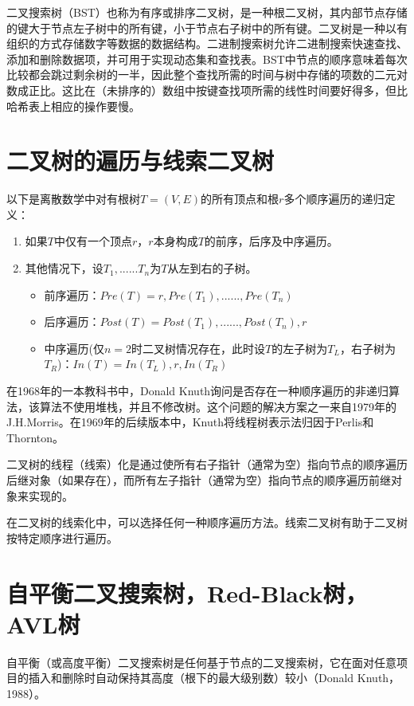 二叉搜索树（BST）\cite{enwiki:1027048298}也称为有序或排序二叉树，是一种根二叉树，其内部节点存储的键大于节点左子树中的所有键，小于节点右子树中的所有键。二叉树是一种以有组织的方式存储数字等数据的数据结构。二进制搜索树允许二进制搜索快速查找、添加和删除数据项，并可用于实现动态集和查找表。BST中节点的顺序意味着每次比较都会跳过剩余树的一半，因此整个查找所需的时间与树中存储的项数的二元对数成正比。这比在（未排序的）数组中按键查找项所需的线性时间要好得多，但比哈希表上相应的操作要慢。

\section{二叉树的遍历与线索二叉树}

以下是离散数学中对有根树$T=(V,E)$的所有顶点和根$r$多个顺序遍历的递归定义：

\begin{enumerate}
	\item 如果$T$中仅有一个顶点$r$，$r$本身构成$T$的前序，后序及中序遍历。
	\item 其他情况下，设$T_1,......T_n$为$T$从左到右的子树。
	\begin{itemize}
		\item 前序遍历：$Pre(T)=r,Pre(T_1),......,Pre(T_n)$
		\item 后序遍历：$Post(T)=Post(T_1),......,Post(T_n),r$
		\item 中序遍历(仅$n=2$时二叉树情况存在，此时设$T$的左子树为$T_L$，右子树为$T_R$)：$In(T)=In(T_L),r,In(T_R)$
	\end{itemize}
\end{enumerate}

在1968年的一本教科书中，Donald Knuth询问是否存在一种顺序遍历的非递归算法，该算法不使用堆栈，并且不修改树。这个问题的解决方案之一来自1979年的J.H.Morris。在1969年的后续版本中，Knuth将线程树表示法归因于Perlis和Thornton。

二叉树的线程（线索）化是通过使所有右子指针（通常为空）指向节点的顺序遍历后继对象（如果存在），而所有左子指针（通常为空）指向节点的顺序遍历前继对象来实现的。

在二叉树的线索化中，可以选择任何一种顺序遍历方法。线索二叉树有助于二叉树按特定顺序进行遍历。


\section{自平衡二叉搜索树，Red-Black树， AVL树}

自平衡（或高度平衡）二叉搜索树是任何基于节点的二叉搜索树，它在面对任意项目的插入和删除时自动保持其高度（根下的最大级别数）较小（Donald Knuth，1988）\cite{enwiki:1002026252}。

